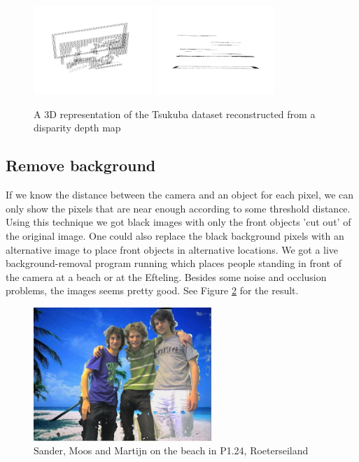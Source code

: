 \documentclass[a4paper]{article}
\begin{document}
\begin{figure}[h!bt]
\centering
\includegraphics[width=0.4\textwidth]{3drep1}
\includegraphics[width=0.4\textwidth]{3drep2}
\caption{A 3D representation of the Tsukuba dataset reconstructed from a
disparity depth map}
\label{3drep}
\end{figure}

\subsection{Remove background}
If we know the distance between the camera and an object for each pixel, we can
only show the pixels that are near enough according to some threshold distance.
Using this technique we got black images with only the front objects 'cut out'
of the original image. One could also replace the black background pixels with
an alternative image to place front objects in alternative locations. We got a
live background-removal program running which places people standing in front of
the camera at a beach or at the Efteling. Besides some noise and occlusion
problems, the images seems pretty good. See Figure \ref{remove-bg} for the
result.

\begin{figure}[h!bt]
\centering
\includegraphics[width=0.6\textwidth]{remove-bg1}
\caption{Sander, Moos and Martijn on the beach in P1.24, Roeterseiland}
\label{remove-bg}
\end{figure}
\end{document}
